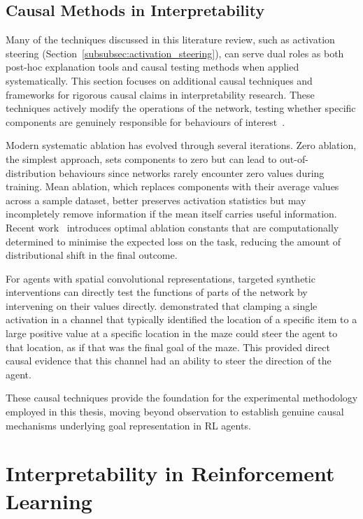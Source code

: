 \subsection{Causal Methods in Interpretability}\label{subsec:causal}

Many of the techniques discussed in this literature review, such as activation steering (Section~\ref{subsubsec:activation_steering}), can serve dual roles as both post-hoc explanation tools and causal testing methods when applied systematically. This section focuses on additional causal techniques and frameworks for rigorous causal claims in interpretability research. These techniques actively modify the operations of the network, testing whether specific components are genuinely responsible for behaviours of interest~\citep{10.5555/1642718}.

Modern systematic ablation has evolved through several iterations. Zero ablation, the simplest approach, sets components to zero but can lead to out-of-distribution behaviours since networks rarely encounter zero values during training. Mean ablation, which replaces components with their average values across a sample dataset, better preserves activation statistics but may incompletely remove information if the mean itself carries useful information. Recent work~\citep{li_2024_optimal} introduces optimal ablation constants that are computationally determined to minimise the expected loss on the task, reducing the amount of distributional shift in the final outcome.

For agents with spatial convolutional representations, targeted synthetic interventions can directly test the functions of parts of the network by intervening on their values directly. \citet{mini_2023_understanding} demonstrated that clamping a single activation in a channel that typically identified the location of a specific item to a large positive value at a specific location in the maze could steer the agent to that location, as if that was the final goal of the maze. This provided direct causal evidence that this channel had an ability to steer the direction of the agent.

These causal techniques provide the foundation for the experimental methodology employed in this thesis, moving beyond observation to establish genuine causal mechanisms underlying goal representation in RL agents.


\section{Interpretability in Reinforcement Learning}\label{sec:rl_interpretability}

